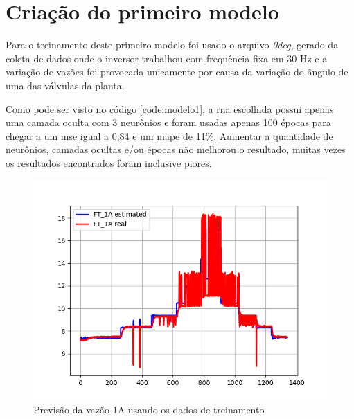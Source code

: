 \documentclass[12pt]{article}
\begin{document}
\section {Criação do primeiro modelo}
\label{sec:modelo1}



Para o treinamento deste primeiro modelo foi usado o arquivo \textit{0deg}, gerado da coleta de dados onde o inversor trabalhou com frequência fixa em 30 Hz e a variação de vazões foi provocada unicamente por causa da variação do ângulo de uma das válvulas da planta.

Como pode ser visto no código \ref{code:modelo1}, a \acrshort{rna} escolhida possui apenas uma camada oculta com 3 neurônios e foram usadas apenas 100 épocas para chegar a um \acrshort{mse} igual a 0,84 e um \acrshort{mape} de 11\%. Aumentar a quantidade de neurônios, camadas ocultas e/ou épocas não melhorou o resultado, muitas vezes os resultados encontrados foram inclusive piores.

\begin{figure}
    \centering
    \includegraphics{results/initial-training-1A.png}
    \caption{Previsão da vazão 1A usando os dados de treinamento}
    \label{fig:initial-training-1A}
\end{figure}
\end{document}
